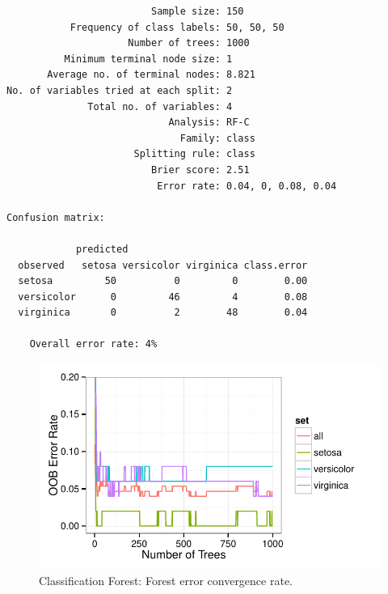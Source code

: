 \documentclass[nojss,letterpaper]{jss}\usepackage[]{graphicx}\usepackage[]{color}
\makeatletter
\def\maxwidth{ %
  \ifdim\Gin@nat@width>\linewidth
    \linewidth
  \else
    \Gin@nat@width
  \fi
}
\newenvironment{kframe}{%
 \def\at@end@of@kframe{}%
 \ifinner\ifhmode%
  \def\at@end@of@kframe{\end{minipage}}%
  \begin{minipage}{\columnwidth}%
 \fi\fi%
 \def\FrameCommand##1{\hskip\@totalleftmargin \hskip-\fboxsep
 \colorbox{shadecolor}{##1}\hskip-\fboxsep
     \hskip-\linewidth \hskip-\@totalleftmargin \hskip\columnwidth}%
 \MakeFramed {\advance\hsize-\width
   \@totalleftmargin\z@ \linewidth\hsize
   \@setminipage}}%
 {\par\unskip\endMakeFramed%
 \at@end@of@kframe}
\newenvironment{knitrout}{}{} %
\makeatother
\begin{document}
\begin{knitrout}\footnotesize
{}\color{fgcolor}\begin{kframe}
\begin{verbatim}
                         Sample size: 150
           Frequency of class labels: 50, 50, 50
                     Number of trees: 1000
          Minimum terminal node size: 1
       Average no. of terminal nodes: 8.821
No. of variables tried at each split: 2
              Total no. of variables: 4
                            Analysis: RF-C
                              Family: class
                      Splitting rule: class
                         Brier score: 2.51 
                          Error rate: 0.04, 0, 0.08, 0.04

Confusion matrix:

            predicted
  observed   setosa versicolor virginica class.error
  setosa         50          0         0        0.00
  versicolor      0         46         4        0.08
  virginica       0          2        48        0.04

	Overall error rate: 4% 
\end{verbatim}
\end{kframe}\begin{figure}[!htpb]

{\centering \includegraphics[width=\maxwidth]{figure/vig-iris-rf-error-1} 

}

\caption[Classification Forest]{Classification Forest: Forest error convergence rate.\label{fig:iris-rf-error}}
\end{figure}


\end{knitrout}
\end{document}

